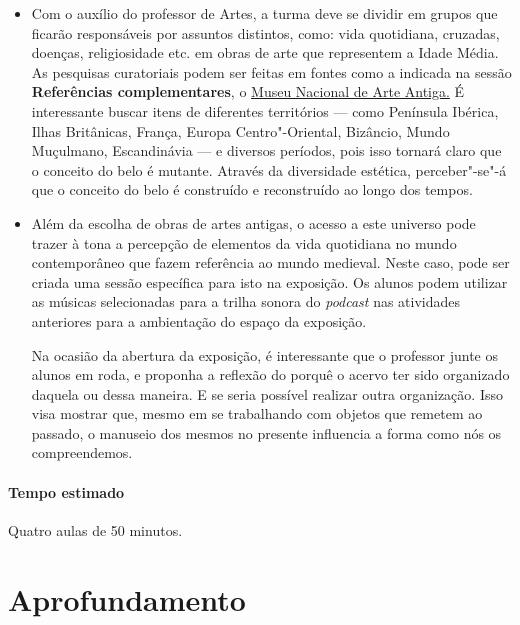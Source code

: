 \documentclass[12pt]{extarticle}
\begin{document}
\begin{itemize}

 		\item
 		Com o auxílio do professor de Artes, a turma deve se dividir em grupos
 		que ficarão responsáveis por assuntos distintos, como: vida quotidiana, 
 		cruzadas, doenças, religiosidade etc. em obras de arte que representem a Idade Média. 
 		As pesquisas curatoriais podem ser feitas em fontes como a indicada na 
 		sessão \textbf{Referências complementares}, o \href{https://artsandculture.google.com/partner/national-museum-of-ancient-art}{Museu Nacional de Arte Antiga.} 
 		É interessante buscar itens de diferentes territórios --- como Península
		Ibérica, Ilhas Britânicas, França, Europa Centro"-Oriental, Bizâncio,
		Mundo Muçulmano, Escandinávia --- e diversos períodos, pois isso tornará
		claro que o conceito do belo é mutante. Através da diversidade estética,
		perceber"-se"-á que o conceito do belo é construído e reconstruído ao
		longo dos tempos.

\item 
		Além da escolha de obras de artes antigas, o acesso a este universo 
		pode trazer à tona a percepção de elementos da vida quotidiana no
		mundo contemporâneo que fazem referência ao mundo medieval. Neste caso,
		pode ser criada uma sessão específica para isto na exposição.
		Os alunos podem utilizar as músicas selecionadas para a trilha sonora 
		do \textit{podcast} nas atividades anteriores para a ambientação do espaço da exposição. 

		Na ocasião da abertura da exposição, é interessante que o professor junte 
		os alunos em roda, e proponha a reflexão do porquê o acervo ter sido organizado 
		daquela ou dessa maneira. E se seria possível realizar outra organização. Isso visa mostrar que,
		mesmo em se trabalhando com objetos que remetem ao passado, o manuseio
		dos mesmos no presente influencia a forma como nós os compreendemos.
 \end{itemize}

 \paragraph{Tempo estimado} Quatro aulas de 50 minutos.


\section{Aprofundamento}

\end{document}
